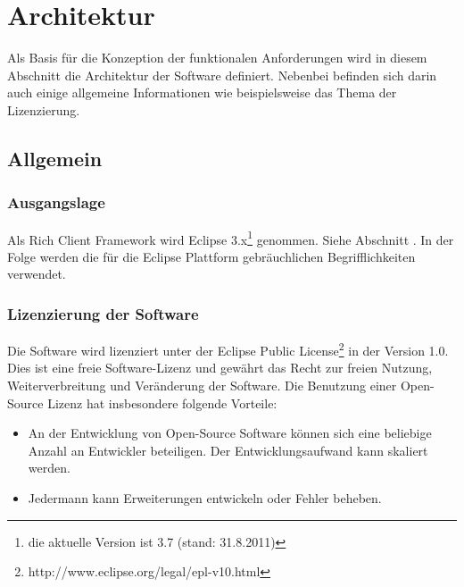 \chapter{Architektur}\label{konzept_1}
Als Basis für die Konzeption der funktionalen Anforderungen wird in diesem Abschnitt die Architektur der Software definiert. Nebenbei befinden sich darin auch einige allgemeine Informationen wie beispielsweise das Thema der Lizenzierung.
\section{Allgemein}
\subsection{Ausgangslage}
Als Rich Client Framework wird Eclipse 3.x\footnote{die aktuelle Version ist 3.7 (stand: 31.8.2011)} genommen. Siehe Abschnitt . In der Folge werden die für die Eclipse Plattform gebräuchlichen Begrifflichkeiten verwendet. 

\subsection{Lizenzierung der Software}
Die Software wird lizenziert unter der Eclipse Public License\footnote{http://www.eclipse.org/legal/epl-v10.html} in der Version 1.0. Dies ist eine freie Software-Lizenz und gewährt das Recht zur freien Nutzung, Weiterverbreitung und Veränderung der Software. Die Benutzung einer Open-Source Lizenz hat insbesondere folgende Vorteile:
\begin{itemize}
	\item An der Entwicklung von Open-Source Software können sich eine beliebige Anzahl an Entwickler beteiligen. Der Entwicklungsaufwand kann skaliert werden.
	\item Jedermann kann Erweiterungen entwickeln oder Fehler beheben.
\end{itemize}

